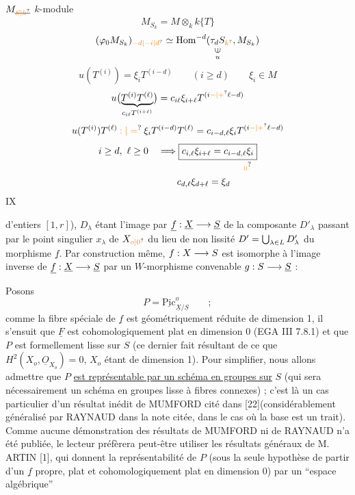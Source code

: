 $M_{\deleted{\unsure{S|k}}}$ $k$-module
\[
 M_{S_k}=M\otimes_k k\{T\}
\]
\[
 (\varphi_0 M_{S_k})_{\unsure{-d|-i|d}}\simeq
 \underset{\substack{\rotatebox{90}{$\in$}\\u}}{\mathrm{Hom}^{-d}(\tau_d S_{\unsure{k}}, M_{S_k})}
\]
\[
 u(T^{(i)})=\xi_i T^{(i-d)}\qquad(i\geq d)\qquad \xi_i\in M
\]
\[
 u\bigl(\underbrace{T^{(i)}T^{(\ell)}}_{c_{i\ell}T^{(i+\ell)}}\bigr)
 =c_{i\ell}\xi_{i+\ell}T^{(i\unsure{-|+}\ell-d)}
\]
\[
 u(T^{(i)})T^{(\ell)}\mathbin{\unsure{:|=}}\xi_i T^{(i-d)}T^{(\ell)}
 =c_{i-d,\ell}\xi_i T^{(i\unsure{-|+}\ell-d)}
\]
\[
 \begin{aligned}
 i\geq d,\ \ell\geq0\quad &\Longrightarrow
 \boxed{c_{i,\ell}\xi_{i+\ell}=c_{i-d,\ell}\xi_i}\\[-2pt]
 &\hspace{9em}\unsure{\shortparallel}\\
 &\hspace{2em}c_{d,\ell}\xi_{d+\ell}=\xi_d
 \end{aligned}
\]
\hfill IX

d'entiers $[1,r]$), $D_\lambda$ étant l'image par $\underline{f}:\underline{X}\longrightarrow\underline{S}$ de la composante $D'_\lambda$ passant par le point singulier $x_\lambda$ de $X_{\unsure{o|0}}$ du lieu de non lissité $D'=\bigcup_{\lambda\in L}D'_\lambda$ du morphisme $\underline{f}$. Par construction même, $f:X\longrightarrow S$ est isomorphe à l'image inverse de $\underline{f}:\underline{X}\longrightarrow\underline{S}$ par un $W$-morphisme convenable $g:S\longrightarrow\underline{S}$ :


Posons
\[
 P=\underline{\mathrm{Pic}}^{o}_{\underline{X}/\underline{S}}\qquad ;\tag*{(12.8.3)}
\]
comme la fibre spéciale de $\underline{f}$ est géométriquement réduite de dimension 1, il s'ensuit que $\underline{F}$ est cohomologiquement plat en dimension 0 (EGA III 7.8.1) et que $P$ \deleted{\unsure{$-$}}est formellement lisse sur $S$ (ce dernier fait résultant de ce que $H^2(X_o,\underline{O}_{X_o})=0$, $X_o$ étant de dimension 1). Pour simplifier, nous allons admettre que $P$ \uline{est représentable par un schéma en groupes sur} $S$ (qui sera nécessairement un schéma en groupes lisse à fibres connexes) ; c'est là un cas particulier d'un résultat inédit de MUMFORD cité dans [22](considérablement généralisé par RAYNAUD dans la note citée, dans le cas où la base est un trait). Comme aucune démonstration des résultats de MUMFORD ni de RAYNAUD n'a été publiée, le lecteur préfèrera peut-être utiliser les résultats généraux de M. ARTIN [1], qui donnent la représentabilité de $P$ (sous la seule hypothèse de partir d'un $\underline{f}$ propre, plat et cohomologiquement plat en dimension 0) par un ``espace algébrique''

